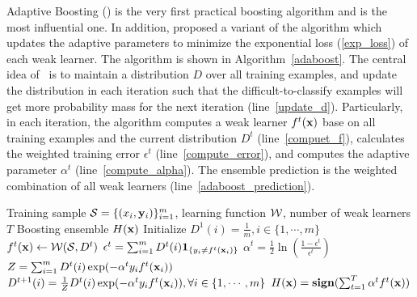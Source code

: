{Adaptive Boosting (\adaboost) \citet{Freund97a} is the very first practical boosting algorithm and is the most influential one.
In addition, \citet{Schapire99improved} proposed a variant of the algorithm which updates the adaptive parameters to minimize the exponential loss (\ref{exp_loss}) of each weak learner.
The algorithm is shown in Algorithm~\ref{adaboost}.
The central idea of \adaboost\ is to maintain a distribution $D$ over all training examples, and update the distribution in each iteration such that the difficult-to-classify examples will get more probability mass for the next iteration (line~\ref{update_d}).
Particularly, in each iteration, the algorithm computes a weak learner $f^t(\mathbf {x})$ base on all training examples and the current distribution $D^{t}$ (line~\ref{compuet_f}), calculates the weighted training error $\epsilon^t$ (line~\ref{compute_error}), and computes the adaptive parameter $\alpha^t$ (line~\ref{compute_alpha}).
The ensemble prediction is the weighted combination of all weak learners (line~\ref{adaboost_prediction}).

\begin{algorithm}
\caption{\adaboost}
\label{adaboost}
\begin{algorithmic}[1]
	\REQUIRE Training sample $\mathcal{S} = \{(x_i,\mathbf {y}_i)\}_{i=1}^m$, learning function $\mathcal{W}$, number of weak learners $T$
	\ENSURE Boosting ensemble $H(\mathbf {x})$
	\STATE Initialize $D^1(i)=\frac{1}{m},i\in\{1,\cdots,m\}$
		\STATE $f^t(\mathbf {x})\leftarrow\mathcal{W}(\mathcal{S},D^{t})$ \label{compuet_f}
		\STATE $\epsilon^t = \sum_{i=1}^{m}D^t(i)\mathbf{1}_{\{y_i\neq f^t(\mathbf {x}_i)\}}$ \label{compute_error}
		\STATE $\alpha^{t} = \frac{1}{2}\ln\left(\frac{1-\epsilon^t}{\epsilon^t}\right)$ \label{compute_alpha}
		\STATE $Z=\sum_{i=1}^{m}D^{t}(i)\exp(-\alpha^ty_if^t(\mathbf {x}_i))$
		\STATE $D^{t+1}(i) = \frac{1}{Z}D^{t}(i)\exp(-\alpha^ty_if^t(\mathbf {x}_i)),\forall i\in\{1,\cdots,m\}$ \label{update_d}
	\ENDFOR
	\RETURN $H(\mathbf {x}) = \textbf{sign}(\sum_{t=1}^T\alpha^tf^t(\mathbf {x}))$ \label{adaboost_prediction}
\end{algorithmic}
\end{algorithm}

}
